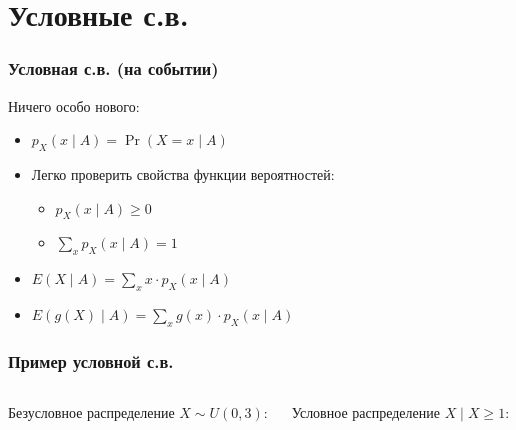 \documentclass[hyperref=unicode,graphics=pdflatex,13pt,xcolor={usenames,dvipsnames}]{beamer}
\newcommand\pitem{\pause\item}
\begin{document}
\section{Условные с.в.}
\begin{frame}
  \frametitle{Условная с.в. (на событии)}

  Ничего особо нового:

  \begin{itemize}
    \item $p_X(x \mid A) = \Pr(X = x \mid A)$
    \pitem Легко проверить свойства функции вероятностей:
    \begin{itemize}
      \item $p_X(x \mid A) \ge 0$
      \item $\sum_x p_X(x \mid A) = 1$
    \end{itemize}
    \pitem $E(X \mid A) = \sum_x x \cdot p_X(x \mid A)$
    \pitem $E(g(X) \mid A) = \sum_x g(x) \cdot p_X(x \mid A)$
  \end{itemize}
\end{frame}


\begin{frame}
  \frametitle{Пример условной с.в.}
  \begin{columns}
    \begin{column}{0.5\textwidth}
      Безусловное распределение $X \sim U(0, 3)$:
    \end{column}
    \begin{column}{0.5\textwidth}
      Условное распределение $X \mid X \ge 1$:
    \end{column}
  \end{columns}
\end{frame}
\end{document}
